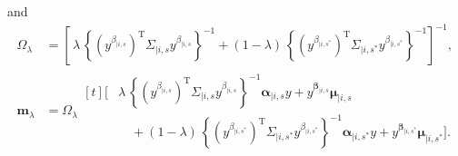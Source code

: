 \documentclass[12pt]{article}
\newcommand{\mvmean}[1]{\symbf{\alpha}_{\mid i, #1} y + y^{\symbf{\beta}_{\mid i, #1}} \symbf{\mu}_{\mid i, #1}}
\newcommand{\mvcov}[1]{\left(y^{\beta_{\mid i, #1}}\right)^{\mathrm{T}} \Sigma_{\mid i, #1} y^{\beta_{\mid i, #1}}}
\begin{document}
and 
\begin{align*}
\Omega_{\lambda}
  &= \left[\,\lambda\,\left\{\mvcov{s}\right\}^{-1}
           +(1-\lambda)\,\left\{\mvcov{s^{*}}\right\}^{-1}\right]^{-1},\\[6pt]
\symbf{m}_{\lambda}
  &= \Omega_{\lambda}
     \begin{aligned}[t]
       \Biggl[&\lambda\,\left\{\mvcov{s}\right\}^{-1}\mvmean{s}\\
            &\quad +(1-\lambda)\,\left\{\mvcov{s^{*}}\right\}^{-1}\mvmean{s^{*}}\Biggr].
     \end{aligned}
\end{align*}
\end{document}
